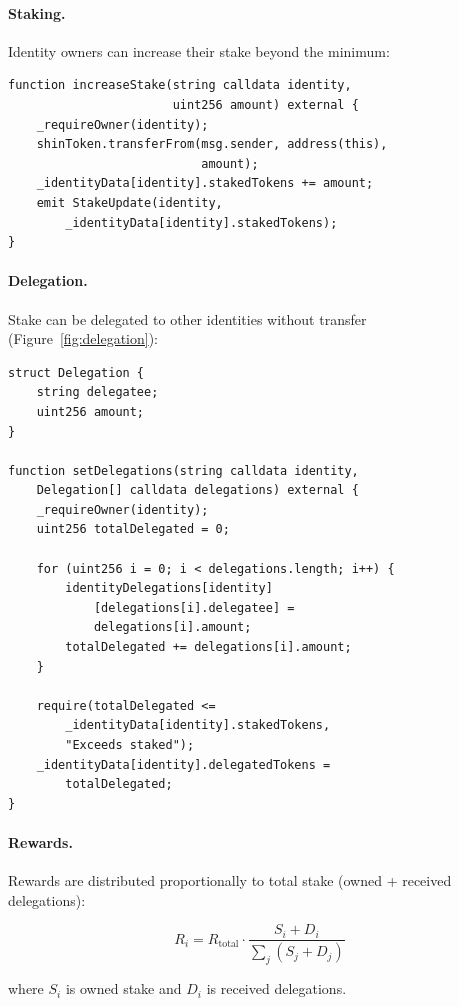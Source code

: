 \documentclass[11pt,twocolumn]{article}
\begin{document}
\paragraph{Staking.} Identity owners can increase their stake beyond the minimum:

\begin{lstlisting}[language=Solidity]
function increaseStake(string calldata identity,
                       uint256 amount) external {
    _requireOwner(identity);
    shinToken.transferFrom(msg.sender, address(this),
                           amount);
    _identityData[identity].stakedTokens += amount;
    emit StakeUpdate(identity,
        _identityData[identity].stakedTokens);
}
\end{lstlisting}

\paragraph{Delegation.} Stake can be delegated to other identities without transfer (Figure~\ref{fig:delegation}):

\begin{lstlisting}[language=Solidity]
struct Delegation {
    string delegatee;
    uint256 amount;
}

function setDelegations(string calldata identity,
    Delegation[] calldata delegations) external {
    _requireOwner(identity);
    uint256 totalDelegated = 0;

    for (uint256 i = 0; i < delegations.length; i++) {
        identityDelegations[identity]
            [delegations[i].delegatee] =
            delegations[i].amount;
        totalDelegated += delegations[i].amount;
    }

    require(totalDelegated <=
        _identityData[identity].stakedTokens,
        "Exceeds staked");
    _identityData[identity].delegatedTokens =
        totalDelegated;
}
\end{lstlisting}

\paragraph{Rewards.} Rewards are distributed proportionally to total stake (owned + received delegations):

\begin{equation}
    R_i = R_{\text{total}} \cdot \frac{S_i + D_i}{\sum_j (S_j + D_j)}
\end{equation}

where $S_i$ is owned stake and $D_i$ is received delegations.
\end{document}
